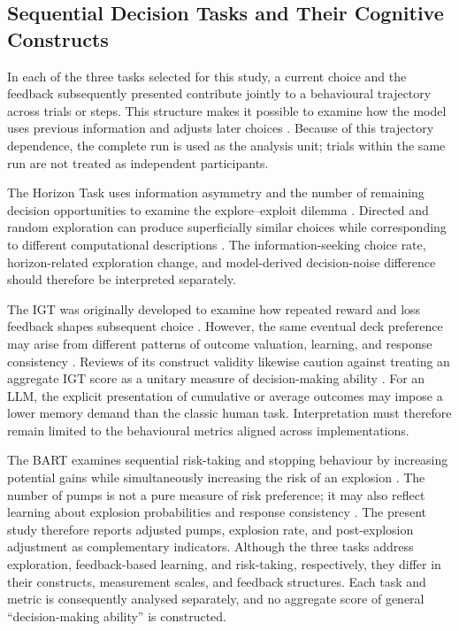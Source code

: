 \subsection{Sequential Decision Tasks and Their Cognitive Constructs}

In each of the three tasks selected for this study, a current choice and the feedback subsequently presented contribute jointly to a behavioural trajectory across trials or steps. This structure makes it possible to examine how the model uses previous information and adjusts later choices \cite{Wilson2014,Bechara1994,Lejuez2002,Loya2023PromptSensitivityDecision}. Because of this trajectory dependence, the complete run is used as the analysis unit; trials within the same run are not treated as independent participants.

The Horizon Task uses information asymmetry and the number of remaining decision opportunities to examine the explore--exploit dilemma \cite{Wilson2014}. Directed and random exploration can produce superficially similar choices while corresponding to different computational descriptions \cite{Gershman2018Exploration}. The information-seeking choice rate, horizon-related exploration change, and model-derived decision-noise difference should therefore be interpreted separately.

The IGT was originally developed to examine how repeated reward and loss feedback shapes subsequent choice \cite{Bechara1994}. However, the same eventual deck preference may arise from different patterns of outcome valuation, learning, and response consistency \cite{Busemeyer2002PVL,Steingroever2013PVLDelta}. Reviews of its construct validity likewise caution against treating an aggregate IGT score as a unitary measure of decision-making ability \cite{Buelow2009IGTValidity}. For an LLM, the explicit presentation of cumulative or average outcomes may impose a lower memory demand than the classic human task. Interpretation must therefore remain limited to the behavioural metrics aligned across implementations.

The BART examines sequential risk-taking and stopping behaviour by increasing potential gains while simultaneously increasing the risk of an explosion \cite{Lejuez2002}. The number of pumps is not a pure measure of risk preference; it may also reflect learning about explosion probabilities and response consistency \cite{Wallsten2005BARTModel,VanRavenzwaaij2011BART}. The present study therefore reports adjusted pumps, explosion rate, and post-explosion adjustment as complementary indicators. Although the three tasks address exploration, feedback-based learning, and risk-taking, respectively, they differ in their constructs, measurement scales, and feedback structures. Each task and metric is consequently analysed separately, and no aggregate score of general ``decision-making ability'' is constructed.

